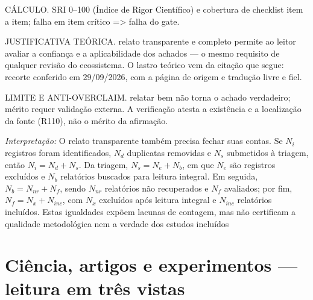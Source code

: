 \begin{resultado}
CÁLCULO. SRI 0--100 (Índice de Rigor Científico) e cobertura de checklist item a item; falha em item crítico => falha do gate.
\end{resultado}

\begin{descricao}
JUSTIFICATIVA TEÓRICA. relato transparente e completo permite ao leitor avaliar a confiança e a aplicabilidade dos achados — o mesmo requisito de qualquer revisão do ecossistema. O lastro teórico vem da citação que segue: recorte conferido em 29/09/2026, com a página de origem e tradução livre e fiel.
\end{descricao}

\begin{aviso}
LIMITE E ANTI-OVERCLAIM. relatar bem não torna o achado verdadeiro; mérito requer validação externa. A verificação atesta a existência e a
localização da fonte (R110), não o mérito da afirmação.
\end{aviso}

\noindent\textit{Interpretação:} O relato transparente também precisa fechar suas contas. Se $N_i$ registros foram identificados, $N_d$ duplicatas removidas e $N_s$ submetidos à triagem, então $N_i=N_d+N_s$. Da triagem, $N_s=N_e+N_b$, em que $N_e$ são registros excluídos e $N_b$ relatórios buscados para leitura integral. Em seguida, $N_b=N_{nr}+N_f$, sendo $N_{nr}$ relatórios não recuperados e $N_f$ avaliados; por fim, $N_f=N_x+N_{inc}$, com $N_x$ excluídos após leitura integral e $N_{inc}$ relatórios incluídos. Estas igualdades expõem lacunas de contagem, mas não certificam a qualidade metodológica nem a verdade dos estudos incluídos 


\clearpage\section{Ciência, artigos e experimentos — leitura em três vistas}\label{arch:AR11}




